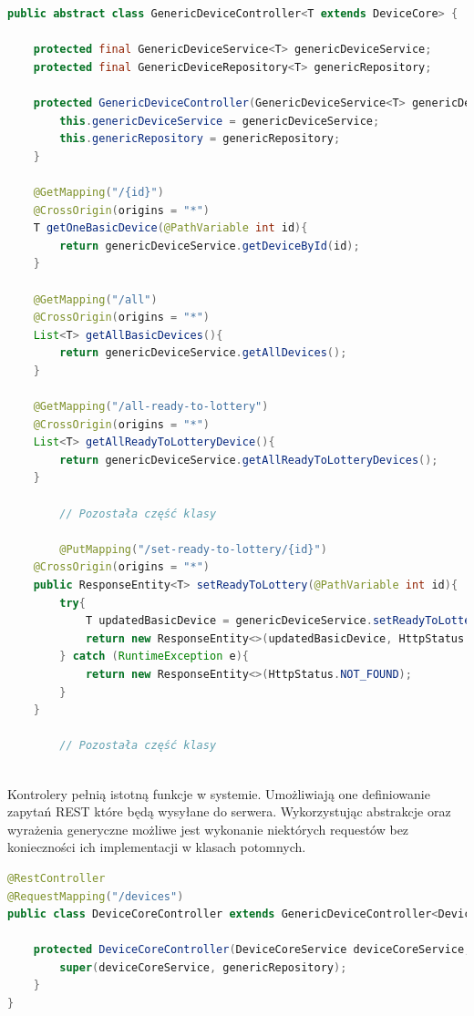 \begin{lstlisting}[language=Java, style=JavaStyle,  caption={Klasa nadrzędna kontrolera sprzętu: GenericDeviceController}, label={controller_genericDevice}]
public abstract class GenericDeviceController<T extends DeviceCore> {

    protected final GenericDeviceService<T> genericDeviceService;
    protected final GenericDeviceRepository<T> genericRepository;

    protected GenericDeviceController(GenericDeviceService<T> genericDeviceService, GenericDeviceRepository<T> genericRepository) {
        this.genericDeviceService = genericDeviceService;
        this.genericRepository = genericRepository;
    }

    @GetMapping("/{id}")
    @CrossOrigin(origins = "*")
    T getOneBasicDevice(@PathVariable int id){
        return genericDeviceService.getDeviceById(id);
    }

    @GetMapping("/all")
    @CrossOrigin(origins = "*")
    List<T> getAllBasicDevices(){
        return genericDeviceService.getAllDevices();
    }

    @GetMapping("/all-ready-to-lottery")
    @CrossOrigin(origins = "*")
    List<T> getAllReadyToLotteryDevice(){
        return genericDeviceService.getAllReadyToLotteryDevices();
    }
		
		// Pozostała część klasy
		
		@PutMapping("/set-ready-to-lottery/{id}")
    @CrossOrigin(origins = "*")
    public ResponseEntity<T> setReadyToLottery(@PathVariable int id){
        try{
            T updatedBasicDevice = genericDeviceService.setReadyToLottery(id);
            return new ResponseEntity<>(updatedBasicDevice, HttpStatus.OK);
        } catch (RuntimeException e){
            return new ResponseEntity<>(HttpStatus.NOT_FOUND);
        }
    }
		
		// Pozostała część klasy
		
\end{lstlisting}

Kontrolery pełnią istotną funkcje w systemie. Umożliwiają one definiowanie zapytań REST które będą wysyłane do serwera. Wykorzystując abstrakcje oraz wyrażenia generyczne możliwe jest wykonanie niektórych requestów bez konieczności ich implementacji w klasach potomnych.


\begin{lstlisting}[language=Java, style=JavaStyle,  caption={Klasa potomna reprezentująca ogólną postać sprzętu}, label={controller_device}]
@RestController
@RequestMapping("/devices")
public class DeviceCoreController extends GenericDeviceController<DeviceCore>{

    protected DeviceCoreController(DeviceCoreService deviceCoreService, GenericDeviceRepository<DeviceCore> genericRepository) {
        super(deviceCoreService, genericRepository);
    }
}
\end{lstlisting}

